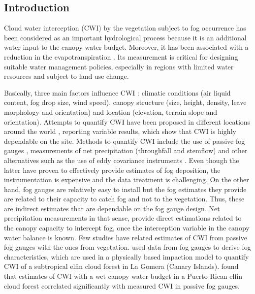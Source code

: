 \documentclass[a4paper,12pt]{article}
\begin{document}
\begin{linenumbers}
\section{Introduction}
Cloud water interception (CWI) by the vegetation subject to fog occurrence has been considered as an important hydrological process because it is an additional water input to the canopy water budget. Moreover, it has been associated with a reduction in the evapotranspiration \citep{Hamiltonetal1995, Bruijnzeel2001, Ritteretal2008}. Its measurement is critical for designing suitable water management policies, especially in regions with limited water resources and subject to land use change. 

Basically, three main factors influence CWI \citep{Braumanetal2010, Villegasetal2008, Ritteretal2008}: climatic conditions (air liquid content, fog drop size, wind speed), canopy structure (size, height, density, leave morphology and orientation) and location (elevation, terrain slope and orientation). Attempts to quantify CWI have been proposed in different locations around the world \citep{Ingrahametal1988, CavalierandGoldstein1989, Hamiltonetal1995, Holder2004, McJannetetal2007a, Gabrieletal2008, GomezPeraltaetal2008, Ritteretal2008, Villegasetal2008, Holwerdaetal2010, Ueharaetal2012, Pryetetal2012a}, reporting variable results, which show that CWI is highly dependable on the site. Methods to quantify CWI include the use of passive fog gauges \citep{Juvik1978, Ingrahametal1988, Aboaletal2000, Villegasetal2008, Frumauetal2011}, measurements of net precipitation (throughfall and stemflow) \citep{Holder2003, Gabrieletal2008, Pradaetal2009, Pryetetal2012a} and other alternatives such as the use of eddy covariance instruments \citep{Changetal2002, Holwerdaetal2006, Eugsteretal2006}. Even though the latter have proven to effectively provide estimates of fog deposition, the instrumentation is expensive and the data treatment is challenging. On the other hand, fog gauges are relatively easy to install but the fog estimates they provide are related to their capacity to catch fog and not to the vegetation. Thus, these are indirect estimates that are dependable on the fog gauge design. Net precipitation measurements in that sense, provide direct estimations related to the canopy capacity to intercept fog, once the interception variable in the canopy water balance is known. Few studies have related estimates of CWI from passive fog gauges with the ones from vegetation. \cite{Ritteretal2008} used data from fog gauges to derive fog characteristics, which are used in a physically based impaction model to quantify CWI of a subtropical elfin cloud forest in La Gomera (Canary Islands). \cite{Holwerdaetal2011} found that estimates of CWI with a wet canopy water budget in a Puerto Rican elfin cloud forest correlated significantly with measured CWI in passive fog gauges.


\end{linenumbers}
\end{document}
